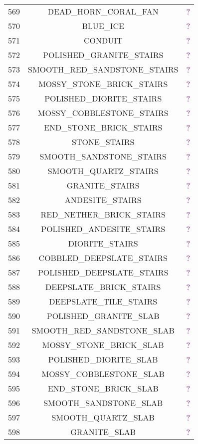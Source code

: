 \documentclass[11pt]{article}
\newcommand\myworries[1]{\textcolor{purple}{#1}}
\begin{document}
\begin{longtable}{ |c|c|c| }
	569 & DEAD\_HORN\_CORAL\_FAN & \myworries{?} \\
	570 & BLUE\_ICE & \myworries{?} \\
	571 & CONDUIT & \myworries{?} \\
	572 & POLISHED\_GRANITE\_STAIRS & \myworries{?} \\
	573 & SMOOTH\_RED\_SANDSTONE\_STAIRS & \myworries{?} \\
	574 & MOSSY\_STONE\_BRICK\_STAIRS & \myworries{?} \\
	575 & POLISHED\_DIORITE\_STAIRS & \myworries{?} \\
	576 & MOSSY\_COBBLESTONE\_STAIRS & \myworries{?} \\
	577 & END\_STONE\_BRICK\_STAIRS & \myworries{?} \\
	578 & STONE\_STAIRS & \myworries{?} \\
	579 & SMOOTH\_SANDSTONE\_STAIRS & \myworries{?} \\
	580 & SMOOTH\_QUARTZ\_STAIRS & \myworries{?} \\
	581 & GRANITE\_STAIRS & \myworries{?} \\
	582 & ANDESITE\_STAIRS & \myworries{?} \\
	583 & RED\_NETHER\_BRICK\_STAIRS & \myworries{?} \\
	584 & POLISHED\_ANDESITE\_STAIRS & \myworries{?} \\
	585 & DIORITE\_STAIRS & \myworries{?} \\
	586 & COBBLED\_DEEPSLATE\_STAIRS & \myworries{?} \\
	587 & POLISHED\_DEEPSLATE\_STAIRS & \myworries{?} \\
	588 & DEEPSLATE\_BRICK\_STAIRS & \myworries{?} \\
	589 & DEEPSLATE\_TILE\_STAIRS & \myworries{?} \\
	590 & POLISHED\_GRANITE\_SLAB & \myworries{?} \\
	591 & SMOOTH\_RED\_SANDSTONE\_SLAB & \myworries{?} \\
	592 & MOSSY\_STONE\_BRICK\_SLAB & \myworries{?} \\
	593 & POLISHED\_DIORITE\_SLAB & \myworries{?} \\
	594 & MOSSY\_COBBLESTONE\_SLAB & \myworries{?} \\
	595 & END\_STONE\_BRICK\_SLAB & \myworries{?} \\
	596 & SMOOTH\_SANDSTONE\_SLAB & \myworries{?} \\
	597 & SMOOTH\_QUARTZ\_SLAB & \myworries{?} \\
	598 & GRANITE\_SLAB & \myworries{?} \\

\end{longtable}
\end{document}

